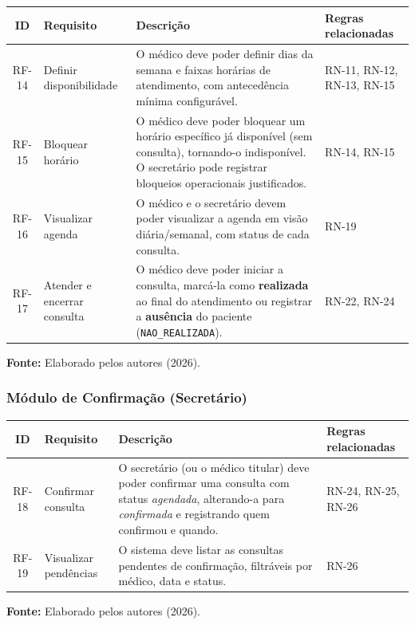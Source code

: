 \documentclass[12pt,a4paper]{article}
\newcommand{\fonte}[1]{%
  \par\vspace{2pt}%
  {\footnotesize\raggedright\textbf{Fonte:} #1\par}%
}
\begin{document}
\begin{table}[H]
\centering
{\footnotesize
\begin{tabularx}{\textwidth}{@{}c>{\raggedright\arraybackslash}p{2.9cm}>{\raggedright\arraybackslash}X>{\raggedright\arraybackslash}p{2.7cm}@{}}
\toprule
ID & Requisito & Descrição & Regras relacionadas \\
\midrule
RF-14 & Definir disponibilidade & O médico deve poder definir dias da semana e faixas horárias de atendimento, com antecedência mínima configurável. & RN-11, RN-12, RN-13, RN-15 \\
RF-15 & Bloquear horário & O médico deve poder bloquear um horário específico já disponível (sem consulta), tornando-o indisponível. O secretário pode registrar bloqueios operacionais justificados. & RN-14, RN-15 \\
RF-16 & Visualizar agenda & O médico e o secretário devem poder visualizar a agenda em visão diária/semanal, com status de cada consulta. & RN-19 \\
RF-17 & Atender e encerrar consulta & O médico deve poder iniciar a consulta, marcá-la como \textbf{realizada} ao final do atendimento ou registrar a \textbf{ausência} do paciente (\texttt{NAO\_REALIZADA}). & RN-22, RN-24 \\
\bottomrule
\end{tabularx}
}
\fonte{Elaborado pelos autores (2026).}
\end{table}

\subsubsection{Módulo de Confirmação (Secretário)}

\begin{table}[H]
\centering
{\footnotesize
\begin{tabularx}{\textwidth}{@{}c>{\raggedright\arraybackslash}p{2.9cm}>{\raggedright\arraybackslash}X>{\raggedright\arraybackslash}p{2.7cm}@{}}
\toprule
ID & Requisito & Descrição & Regras relacionadas \\
\midrule
RF-18 & Confirmar consulta & O secretário (ou o médico titular) deve poder confirmar uma consulta com status \textit{agendada}, alterando-a para \textit{confirmada} e registrando quem confirmou e quando. & RN-24, RN-25, RN-26 \\
RF-19 & Visualizar pendências & O sistema deve listar as consultas pendentes de confirmação, filtráveis por médico, data e status. & RN-26 \\
\bottomrule
\end{tabularx}
}
\fonte{Elaborado pelos autores (2026).}
\end{table}
\end{document}
